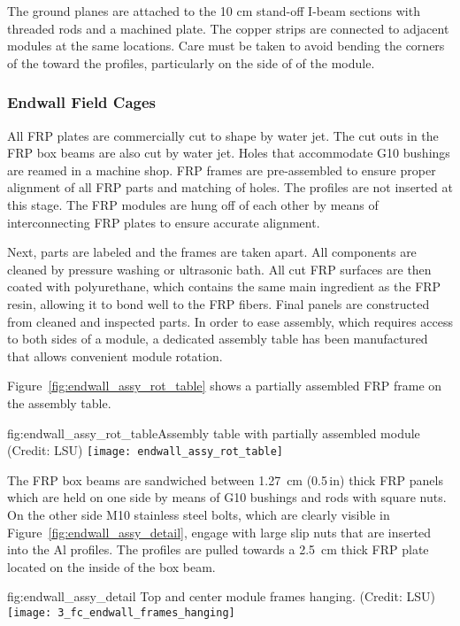 The ground planes are attached to the 10 cm stand-off I-beam sections with threaded rods and a machined plate. The copper strips are connected to adjacent modules at the same locations. Care must be taken to avoid bending the corners of the  toward the profiles, particularly on the  side of of the module.


\subsubsection{Endwall Field Cages}
All FRP plates are commercially cut to shape by water jet. The cut outs in the FRP box beams are also cut by water jet. Holes that accommodate G10 bushings are reamed in a machine shop. FRP frames are pre-assembled to ensure proper alignment of all FRP parts and matching of holes. The profiles are not inserted at this stage. The FRP modules are hung off of each other by means of interconnecting FRP plates to ensure accurate alignment.

Next, parts are labeled and the frames are taken apart. All components are cleaned by pressure washing or ultrasonic bath. All cut FRP surfaces are then coated with polyurethane, which contains the same main ingredient as the FRP resin, allowing it to bond well to the FRP fibers. Final panels are constructed from cleaned and inspected parts. In order to ease assembly, which requires access to both sides of a module,
a dedicated assembly table has been manufactured that allows convenient module rotation. 

Figure~\ref{fig:endwall_assy_rot_table} shows a partially assembled  FRP frame on the assembly table.
\begin{dunefigure}{fig:endwall_assy_rot_table}{Assembly table with partially assembled  module (Credit: LSU)}
 \texttt{[image: endwall\_assy\_rot\_table]}
 \end{dunefigure}

The FRP box beams are sandwiched between \SI{1.27}{\cm} (\num{0.5}\,in) thick FRP panels which are held on one side by means of G10 bushings and rods with square nuts.
On the other side M10 stainless steel bolts, which are clearly visible in Figure~\ref{fig:endwall_assy_detail},  
engage with large slip nuts that are inserted into the Al profiles. The profiles 
are pulled towards a \SI{2.5}{\cm} thick FRP plate located 
on the inside of the box beam.
%

\begin{dunefigure}{fig:endwall_assy_detail}{%
Top and center  module frames hanging. (Credit: LSU)}
\texttt{[image: 3\_fc\_endwall\_frames\_hanging]}
\end{dunefigure}


